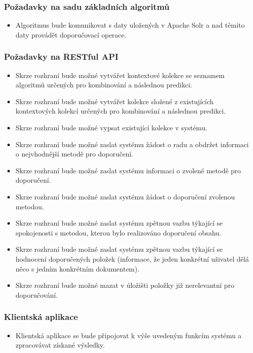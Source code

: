 \documentclass[thesis=M,czech]{FITthesis}[2014/05/07]
\begin{document}
\subsubsection{Požadavky na sadu základních algoritmů}
\begin{itemize}
	\item Algoritmus bude komunikovat s daty uložených v Apache Solr a nad těmito daty provádět doporučovací operace.
\end{itemize}

\subsubsection{Požadavky na RESTful API}
\begin{itemize}
	\item Skrze rozhraní bude možné vytvářet kontextové kolekce se seznamem algoritmů určených pro kombinování a následnou predikci.
	\item Skrze rozhraní bude možné vytvářet kolekce složené z existujících kontextových kolekcí určených pro kombinování a následnou predikci.
	\item Skrze rozhraní bude možné vypsat existující kolekce v systému.		
	\item Skrze rozhraní bude možné zaslat systému žádost o radu a obdržet informaci o nejvhodnější metodě pro doporučení.
	\item Skrze rozhraní bude možné zaslat systému informaci o zvolené metodě pro doporučení.
	\item Skrze rozhraní bude možné zaslat systému žádost o doporučení zvolenou metodou.	
	\item Skrze rozhraní bude možné zaslat systému zpětnou vazbu týkající se spokojenosti s metodou, kterou bylo realizováno doporučení obsahu.
	\item Skrze rozhraní bude možné zaslat systému zpětnou vazbu týkající se hodnocení doporučených položek (informace, že jeden konkrétní uživatel dělá něco s jedním konkrétním dokumentem).
	\item Skrze rozhraní bude možné mazat v úložišti položky již nerelevantní pro doporučování. 
\end{itemize}

\subsubsection{Klientská aplikace}
\begin{itemize}
	\item Klientská aplikace se bude připojovat k výše uvedeným funkcím systému a zpracovávat získané výsledky.
\end{itemize}
\end{document}
